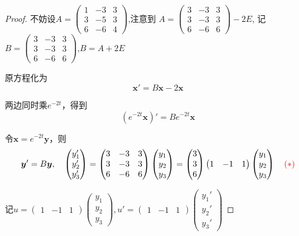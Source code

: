 \begin{proof}
不妨设$ A= \begin{pmatrix}
1&-3&3\\
3&-5&3\\
6&-6&4
\end{pmatrix}  $,注意到 $ A = \begin{pmatrix}
3&-3&3\\
3&-3&3\\
6&-6&6
\end{pmatrix} - 2 E$,
记$ B = \begin{pmatrix}
3&-3&3\\
3&-3&3\\
6&-6&6
\end{pmatrix} $,$B = A+2E $

原方程化为$$ \boldsymbol{x}' = B\boldsymbol{x} - 2 \boldsymbol{x}   $$

两边同时乘$e^{-2t} $，得到$$ (e^{-2t} \boldsymbol{x})' = B e^{-2t} \boldsymbol{x} $$

令$ \boldsymbol{x} = e^{-2t} \boldsymbol{y} $，则$$ \boldsymbol{y}' = B \boldsymbol{y} , \quad
\begin{pmatrix}y_1'\\y_2'\\y_3'\end{pmatrix}=
\begin{pmatrix}3&-3&3\\3&-3&3\\6&-6&6\end{pmatrix} 
\begin{pmatrix}y_1\\y_2\\y_3\end{pmatrix} =
\begin{pmatrix}3\\3\\6\end{pmatrix} \begin{pmatrix}1&-1&1\end{pmatrix} 
\begin{pmatrix}y_1\\y_2\\y_3\end{pmatrix}\quad \textcolor{red}{(*)}$$ 

记$ u =  
\begin{pmatrix}1&-1&1\end{pmatrix}
\begin{pmatrix}y_1\\y_2\\y_3\end{pmatrix}
 , u' = 
\begin{pmatrix}1&-1&1\end{pmatrix}
\begin{pmatrix}y_1'\\y_2'\\y_3'\end{pmatrix} $


\end{proof}
